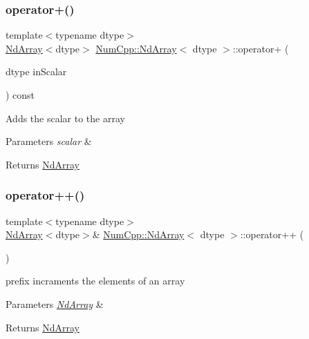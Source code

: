 \subsubsection{\texorpdfstring{operator+()}{operator+()}\hspace{0.1cm}{\footnotesize\ttfamily [2/2]}}
{\footnotesize\ttfamily template$<$typename dtype$>$ \\
\mbox{\hyperlink{class_num_cpp_1_1_nd_array}{Nd\+Array}}$<$dtype$>$ \mbox{\hyperlink{class_num_cpp_1_1_nd_array}{Num\+Cpp\+::\+Nd\+Array}}$<$ dtype $>$\+::operator+ (\begin{DoxyParamCaption}\item[{dtype}]{in\+Scalar }\end{DoxyParamCaption}) const\hspace{0.3cm}{\ttfamily [inline]}}

Adds the scalar to the array


\begin{DoxyParams}{Parameters}
{\em scalar} & \\
\hline
\end{DoxyParams}
\begin{DoxyReturn}{Returns}
\mbox{\hyperlink{class_num_cpp_1_1_nd_array}{Nd\+Array}} 
\end{DoxyReturn}
\mbox{\label{class_num_cpp_1_1_nd_array_ab02d7b130ec279b2da5ed2ac5b976b43}} 
\subsubsection{\texorpdfstring{operator++()}{operator++()}\hspace{0.1cm}{\footnotesize\ttfamily [1/2]}}
{\footnotesize\ttfamily template$<$typename dtype$>$ \\
\mbox{\hyperlink{class_num_cpp_1_1_nd_array}{Nd\+Array}}$<$dtype$>$\& \mbox{\hyperlink{class_num_cpp_1_1_nd_array}{Num\+Cpp\+::\+Nd\+Array}}$<$ dtype $>$\+::operator++ (\begin{DoxyParamCaption}{ }\end{DoxyParamCaption})\hspace{0.3cm}{\ttfamily [inline]}}

prefix incraments the elements of an array


\begin{DoxyParams}{Parameters}
{\em \mbox{\hyperlink{class_num_cpp_1_1_nd_array}{Nd\+Array}}} & \\
\hline
\end{DoxyParams}
\begin{DoxyReturn}{Returns}
\mbox{\hyperlink{class_num_cpp_1_1_nd_array}{Nd\+Array}} 
\end{DoxyReturn}
\mbox{\label{class_num_cpp_1_1_nd_array_a3b71c8d4b1f8bf6403a270df980ae7c9}} 
